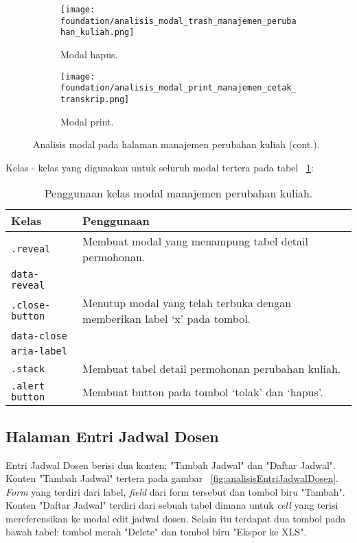 \begin{figure} [H] \ContinuedFloat
	\centering
	\begin{subfigure}[b]{0.6\linewidth} 
		\texttt{[image: foundation/analisis\_modal\_trash\_manajemen\_perubahan\_kuliah.png]}
		\caption{Modal hapus.}
	\end{subfigure}
	\begin{subfigure}[b]{0.6\linewidth}
		\texttt{[image: foundation/analisis\_modal\_print\_manajemen\_cetak\_transkrip.png]}
		\caption{Modal print.}  
	\end{subfigure}	
\caption{Analisis modal pada halaman manajemen perubahan kuliah (cont.).}  
\label{fig:analisisModalManajemenPerubahanKuliah}
\end{figure}

\noindent Kelas - kelas yang digunakan untuk seluruh modal tertera pada tabel ~\ref{table:analisisModalManajemenPerubahanKuliah}:
\begin{table}[H]
	\centering
	\caption{Penggunaan kelas modal manajemen perubahan kuliah.}
	\begin{tabularx}{\textwidth}{lX}
		\toprule
		Kelas     & Penggunaan \\
		\midrule
		\texttt{.reveal} & Membuat modal yang menampung tabel detail permohonan.\\
		\texttt{data-reveal}&\\
		\texttt{.close-button} & Menutup modal yang telah terbuka dengan memberikan label `x' pada tombol.\\
		\texttt{data-close}& \\
		\texttt{aria-label}& \\
		\texttt{.stack} &	Membuat tabel detail permohonan perubahan kuliah.\\
		\texttt{.alert button} & Membuat button pada tombol `tolak'  dan `hapus'.\\
		\bottomrule
	\end{tabularx}	
	\label{table:analisisModalManajemenPerubahanKuliah}
\end{table}


\subsection{Halaman Entri Jadwal Dosen}
Entri Jadwal Dosen berisi dua konten: "Tambah Jadwal" dan "Daftar Jadwal". Konten "Tambah Jadwal" tertera pada gambar ~\ref{fig:analisisEntriJadwalDosen}. \textit{Form} yang terdiri dari label, \textit{field} dari form tersebut dan tombol biru "Tambah". Konten "Daftar Jadwal" terdiri dari sebuah tabel dimana untuk \textit{cell} yang terisi mereferensikan ke modal edit jadwal dosen. Selain itu terdapat dua tombol pada bawah tabel: tombol merah "Delete" dan tombol biru "Ekspor ke XLS".


